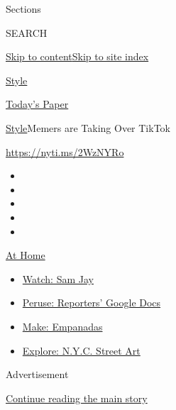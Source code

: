 Sections

SEARCH

\protect\hyperlink{site-content}{Skip to
content}\protect\hyperlink{site-index}{Skip to site index}

\href{https://www.nytimes.com/section/style}{Style}

\href{https://myaccount.nytimes.com/auth/login?response_type=cookie\&client_id=vi}{}

\href{https://www.nytimes.com/section/todayspaper}{Today's Paper}

\href{/section/style}{Style}\textbar{}Memers are Taking Over TikTok

\href{https://nyti.ms/2WzNYRo}{https://nyti.ms/2WzNYRo}

\begin{itemize}
\item
\item
\item
\item
\item
\end{itemize}

\href{https://www.nytimes.com/spotlight/at-home?action=click\&pgtype=Article\&state=default\&region=TOP_BANNER\&context=at_home_menu}{At
Home}

\begin{itemize}
\tightlist
\item
  \href{https://www.nytimes.com/2020/08/04/arts/television/sam-jay-netflix-special.html?action=click\&pgtype=Article\&state=default\&region=TOP_BANNER\&context=at_home_menu}{Watch:
  Sam Jay}
\item
  \href{https://www.nytimes.com/interactive/2020/at-home/even-more-reporters-editors-diaries-lists-recommendations.html?action=click\&pgtype=Article\&state=default\&region=TOP_BANNER\&context=at_home_menu}{Peruse:
  Reporters' Google Docs}
\item
  \href{https://www.nytimes.com/2020/08/04/dining/colombian-empanadas-carlos-gaviria.html?action=click\&pgtype=Article\&state=default\&region=TOP_BANNER\&context=at_home_menu}{Make:
  Empanadas}
\item
  \href{https://www.nytimes.com/2020/08/06/arts/design/street-art-nyc-george-floyd.html?action=click\&pgtype=Article\&state=default\&region=TOP_BANNER\&context=at_home_menu}{Explore:
  N.Y.C. Street Art}
\end{itemize}

Advertisement

\protect\hyperlink{after-top}{Continue reading the main story}

